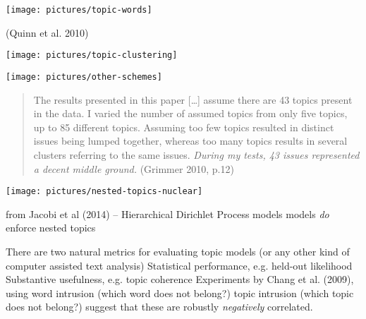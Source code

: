 \documentclass{mediumfoils}
\begin{document}
\centerline{\texttt{[image: pictures/topic-words]}} 

{\footnotesize (Quinn et al. 2010)}


\centerline{\texttt{[image: pictures/topic-clustering]}}


\centerline{\texttt{[image: pictures/other-schemes]}}

%
%
%
%
%


{\small
\begin{quote}
The results presented in this paper [\ldots] assume there are 43 topics present in the data. I varied the number of assumed topics from only five topics, up to 85 different topics. Assuming too few topics resulted in distinct issues being lumped together, whereas too many topics results in several clusters referring to the same issues. \textsl{During my tests, 43 issues represented a decent middle ground.} 
(Grimmer 2010, p.12)
\end{quote}
}


\centerline{\texttt{[image: pictures/nested-topics-nuclear]}}

from Jacobi et al (2014) -- Hierarchical Dirichlet Process models models \textit{do} enforce nested topics


There are two natural metrics for evaluating topic models (or any other kind of computer assisted text analysis)
\ita
\itm Statistical performance, e.g. held-out likelihood
\itm Substantive usefulness, e.g. topic coherence
\itz
Experiments by Chang et al. (2009), using
\ita
\itm word intrusion (which word does not belong?)
\itm topic intrusion (which topic does not belong?)
\itz
suggest that these are robustly \textit{negatively} correlated.
\end{document}
